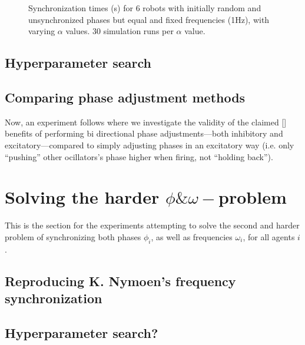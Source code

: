 	
	\begin{figure}[ht!]
		\centering
		\caption{Synchronization times (s) for 6 robots with initially random and unsynchronized phases but equal and fixed frequencies (1Hz), with varying $\alpha$ values. 30 simulation runs per $\alpha$ value.}
	\end{figure}
	
	
	\subsection{Hyperparameter search}
	
	\subsection{Comparing phase adjustment methods}
	Now, an experiment follows where we investigate the validity of the claimed [] benefits of performing bi directional phase adjustments—both inhibitory and excitatory—compared to simply adjusting phases in an excitatory way (i.e. only ``pushing'' other ocillators's phase higher when firing, not ``holding back'').
	
	
	
	
	
	
	\section{Solving the harder $\phi\&\omega-$problem}
	
	This is the section for the experiments attempting to solve the second and harder problem of synchronizing both phases $\phi_i$, as well as frequencies $\omega_i$, for all agents $i$.
	
	\subsection{Reproducing K. Nymoen's frequency synchronization}
	
	\subsection{Hyperparameter search?}